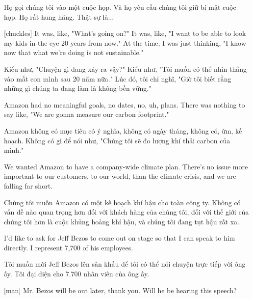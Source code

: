 \documentclass[a4paper]{article}
\begin{document}
	\begin{vietnamese-v2}
		Họ gọi chúng tôi vào một cuộc họp.
		Và họ yêu cầu chúng tôi giữ bí mật cuộc họp.
		Họ rất hung hăng. Thật sự là...
	\end{vietnamese-v2}
	
	[chuckles] It was, like, "What's going on?"
	It was, like, "I want to be able to look my kids in the eye 20 years from now."
	At the time, I was just thinking, "I know now that what we're doing is not sustainable."
	
	\begin{vietnamese-v2}
		 Kiểu như, "Chuyện gì đang xảy ra vậy?"
		Kiểu như, "Tôi muốn có thể nhìn thẳng vào mắt con mình sau 20 năm nữa."
		Lúc đó, tôi chỉ nghĩ, "Giờ tôi biết rằng những gì chúng ta đang làm là không bền vững."
	\end{vietnamese-v2}
	
	Amazon had no meaningful goals, no dates, no, uh, plans.
	There was nothing to say like, "We are gonna measure our carbon footprint."
	
	\begin{vietnamese-v2}
		Amazon không có mục tiêu có ý nghĩa, không có ngày tháng, không có, ừm, kế hoạch.
		Không có gì để nói như, "Chúng tôi sẽ đo lượng khí thải carbon của mình."
	\end{vietnamese-v2}
	
	We wanted Amazon to have a company-wide climate plan.
	There's no issue more important to our customers, to our world, than the climate crisis, and we are falling far short.
	
	\begin{vietnamese-v2}
		Chúng tôi muốn Amazon có một kế hoạch khí hậu cho toàn công ty.
		Không có vấn đề nào quan trọng hơn đối với khách hàng của chúng tôi, đối với thế giới của chúng tôi hơn là cuộc khủng hoảng khí hậu, và chúng tôi đang tụt hậu rất xa.	
	\end{vietnamese-v2}
	
	I'd like to ask for Jeff Bezos to come out on stage so that I can speak to him directly.
	I represent 7,700 of his employees.
	
	\begin{vietnamese-v2}
		Tôi muốn mời Jeff Bezos lên sân khấu để tôi có thể nói chuyện trực tiếp với ông ấy.
		Tôi đại diện cho 7.700 nhân viên của ông ấy.
	\end{vietnamese-v2}
	
	[man] Mr. Bezos will be out later, thank you.
	Will he be hearing this speech?
	
\end{document}
